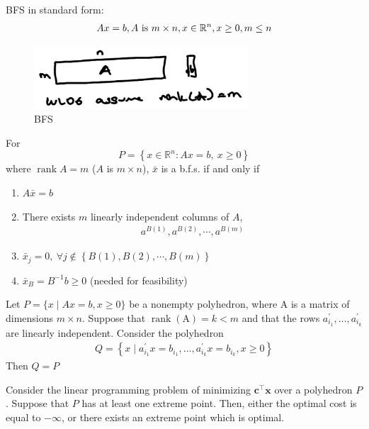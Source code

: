 \documentclass[11pt]{article}
\numberwithin{equation}{section}
\begin{document}
BFS in standard form:
\begin{align*}
    Ax=b, A \text{ is } m \times n, x \in \mathbb R^n, x \geq 0, m \leq n
\end{align*}

\begin{figure}[H]
    \centering
    \includegraphics[width=8cm]{images/6-ex-4.png}
    \caption{BFS}
\end{figure}

\begin{proposition}
    For $$P=\left\{x \in \mathbb{R}^{n}: A x=b, \ x \geq 0\right\}$$ where $\operatorname{rank}A=m$ ($A$ is $m \times n$), $\bar{x}$ is a b.f.s. if and only if \begin{enumerate}[1)]
        \item $A\bar{x}=b$
        \item There exists $m$ linearly independent columns of $A$, \begin{align*}
            a^{B(1)},a^{B(2)},\cdots,a^{B(m)}
        \end{align*}
        \item $\bar{x}_j=0, \ \forall j \notin \left\{ B(1), B(2), \cdots, B(m) \right\}$
        \item $\bar{x}_B = B^{-1}b \geq 0$ (needed for feasibility)
    \end{enumerate}
\end{proposition}

\begin{theorem}
    Let $P=\{x \mid A x=b, x \geq 0\}$ be a nonempty polyhedron, where A is a matrix of dimensions $m \times n$.
    Suppose that $\operatorname{rank}(\mathrm{A})=k<m$ and that the rows $a_{i_{1}}^{\prime}, \ldots, a_{i_{k}}^{\prime}$ are linearly independent. 
    Consider the polyhedron
    \begin{align*}
        Q=\left\{x \mid a_{i_{1}}^{\prime} x=b_{i_{1}}, \ldots, a_{i_{k}}^{\prime} x=b_{i_{k}}, x \geq 0\right\}
    \end{align*}
    Then $Q=P$
\end{theorem}

\begin{theorem}
    Consider the linear programming problem of minimizing $\mathbf{c}^{\top} \mathbf{x}$ over a polyhedron $P$. 
    Suppose that $P$ has at least one extreme point. 
    Then, either the optimal cost is equal to $-\infty$, or there exists an extreme point which is optimal.
\end{theorem}
\end{document}
